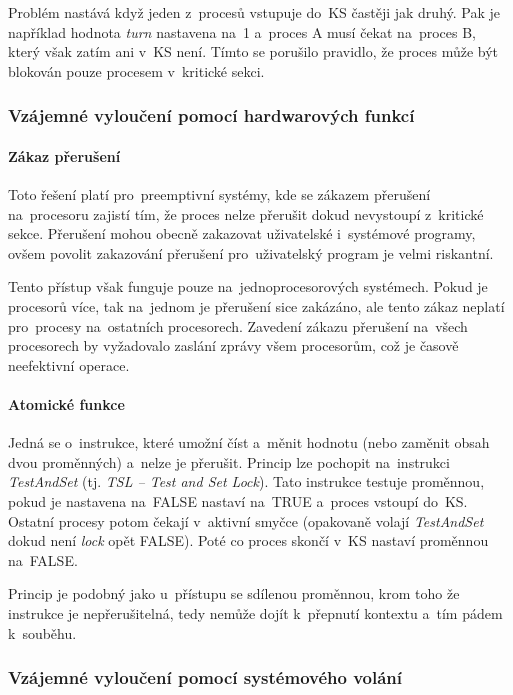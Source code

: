 Problém nastává když jeden z~procesů vstupuje do~KS častěji jak druhý. Pak je například hodnota \emph{turn} nastavena na~1 a~proces A musí čekat na~proces B, který však zatím ani v~KS není. Tímto se porušilo pravidlo, že proces může být blokován pouze procesem v~kritické sekci.

\subsubsection{Vzájemné vyloučení pomocí hardwarových funkcí}

\paragraph{Zákaz přerušení}

Toto řešení platí pro~preemptivní systémy, kde se zákazem přerušení na~procesoru zajistí tím, že proces nelze přerušit dokud nevystoupí z~kritické sekce. Přerušení mohou obecně zakazovat uživatelské i~systémové programy, ovšem povolit zakazování přerušení pro~uživatelský program je velmi riskantní.

Tento přístup však funguje pouze na~jednoprocesorových systémech. Pokud je procesorů více, tak na~jednom je přerušení sice zakázáno, ale tento zákaz neplatí pro~procesy na~ostatních procesorech. Zavedení zákazu přerušení na~všech procesorech by vyžadovalo zaslání zprávy všem procesorům, což je časově neefektivní operace.

\paragraph{Atomické funkce}

Jedná se o~instrukce, které umožní číst a~měnit hodnotu (nebo zaměnit obsah dvou proměnných) a~nelze je přerušit. Princip lze pochopit na~instrukci \emph{TestAndSet} (tj. \emph{TSL -- Test and Set Lock}). Tato instrukce testuje proměnnou, pokud je nastavena na~FALSE nastaví na~TRUE a~proces vstoupí do~KS. Ostatní procesy potom čekají v~aktivní smyčce (opakovaně volají \emph{TestAndSet} dokud není \emph{lock} opět FALSE). Poté co proces skončí v~KS nastaví proměnnou na~FALSE.

Princip je podobný jako u~přístupu se sdílenou proměnnou, krom toho že instrukce je nepřerušitelná, tedy nemůže dojít k~přepnutí kontextu a~tím pádem k~souběhu.

\subsubsection{Vzájemné vyloučení pomocí systémového volání}

